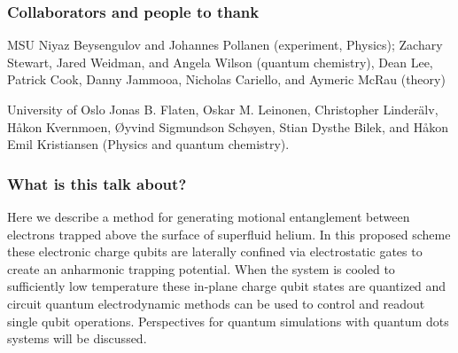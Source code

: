 \documentclass{beamer}
\begin{document}
\begin{frame}
\frametitle{Collaborators and people to thank}

\begin{block}{MSU }
Niyaz Beysengulov and Johannes Pollanen (experiment, Physics); Zachary Stewart, Jared Weidman, and Angela Wilson (quantum chemistry), Dean Lee, Patrick Cook, Danny Jammooa, Nicholas Cariello, and Aymeric McRau (theory)
\end{block}
\begin{block}{University of Oslo }
Jonas B. Flaten, Oskar M. Leinonen, Christopher Linder\"alv, H\aa kon Kvernmoen, \O yvind Sigmundson Sch\o yen, Stian Dysthe Bilek, and H\aa kon Emil Kristiansen (Physics and quantum chemistry).
\end{block}
\end{frame}

\begin{frame}
\frametitle{What is this talk about?}
\begin{block}{}
Here we describe a method for generating motional entanglement between
electrons trapped above the surface of superfluid helium. In this
proposed scheme these electronic charge qubits are laterally confined
via electrostatic gates to create an anharmonic trapping
potential. When the system is cooled to sufficiently low temperature
these in-plane charge qubit states are quantized and circuit quantum
electrodynamic methods can be used to control and readout single qubit
operations. Perspectives for quantum simulations with quantum dots
systems will be discussed.
\end{block}
\end{frame}
\end{document}

